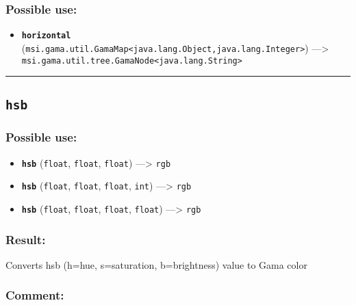 \documentclass[]{book}
\providecommand{\tightlist}{%
  \setlength{\itemsep}{0pt}\setlength{\parskip}{0pt}}
\theoremstyle{definition}
\theoremstyle{definition}
\theoremstyle{definition}
\theoremstyle{remark}
\begin{document}
\subsubsection{Possible use:}\label{possible-use-260}

\begin{itemize}
\tightlist
\item
  \textbf{\texttt{horizontal}}
  (\texttt{msi.gama.util.GamaMap\textless{}java.lang.Object,java.lang.Integer\textgreater{}})
  ---\textgreater{}
  \texttt{msi.gama.util.tree.GamaNode\textless{}java.lang.String\textgreater{}}
\end{itemize}

\begin{center}\rule{0.5\linewidth}{\linethickness}\end{center}

\subsection{\texorpdfstring{\texttt{hsb}}{hsb}}\label{hsb}

\subsubsection{Possible use:}\label{possible-use-261}

\begin{itemize}
\tightlist
\item
  \textbf{\texttt{hsb}} (\texttt{float}, \texttt{float}, \texttt{float})
  ---\textgreater{} \texttt{rgb}
\item
  \textbf{\texttt{hsb}} (\texttt{float}, \texttt{float}, \texttt{float},
  \texttt{int}) ---\textgreater{} \texttt{rgb}
\item
  \textbf{\texttt{hsb}} (\texttt{float}, \texttt{float}, \texttt{float},
  \texttt{float}) ---\textgreater{} \texttt{rgb}
\end{itemize}

\subsubsection{Result:}\label{result-251}

Converts hsb (h=hue, s=saturation, b=brightness) value to Gama color

\subsubsection{Comment:}\label{comment-50}
\end{document}
